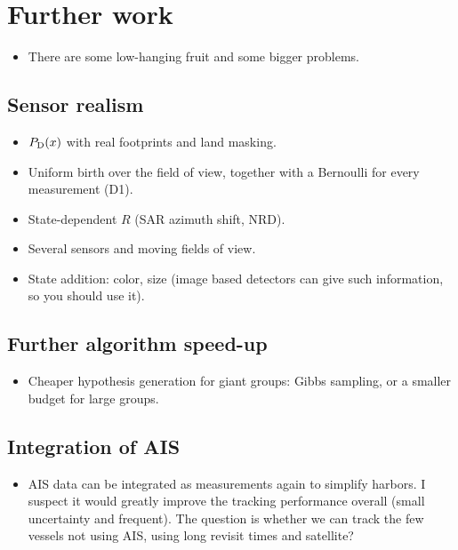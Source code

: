 \section{Further work}
\label{sec:further-work}
\begin{itemize}
    \item There are some low-hanging fruit and some bigger problems. 
\end{itemize}

\subsection{Sensor realism}
\begin{itemize}
    \item $P_{\mathrm{D}}(x)$ with real footprints and land masking.
    \item Uniform birth over the field of view, together with a Bernoulli for every measurement (D1).
    \item State-dependent $R$ (SAR azimuth shift, NRD).
    \item Several sensors and moving fields of view.
    \item State addition: color, size (image based detectors can give such information, so you should use it).
\end{itemize}

\subsection{Further algorithm speed-up}
\begin{itemize}
    \item Cheaper hypothesis generation for giant groups: Gibbs sampling, or a smaller budget for large groups.
\end{itemize}

\subsection{Integration of AIS}
\begin{itemize}
    \item AIS data can be integrated as measurements again to simplify harbors. I suspect it would greatly improve the tracking performance overall (small uncertainty and frequent). The question is whether we can track the few vessels not using AIS, using long revisit times and satellite?
\end{itemize}

